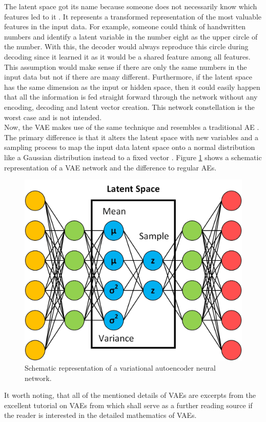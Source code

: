 \documentclass[MGS,Master,english]{twbook}%
\begin{document}
The latent space got its name because someone does not necessarily know which features led to it \cite{ml::vae::tutorial}. It represents a transformed representation of the most valuable features in the input data. For example, someone could think of handwritten numbers and identify a latent variable in the number eight as the upper circle of the number. With this, the decoder would always reproduce this circle during decoding since it learned it as it would be a shared feature among all features. This assumption would make sense if there are only the same numbers in the input data but not if there are many different. Furthermore, if the latent space has the same dimension as the input or hidden space, then it could easily happen that all the information is fed straight forward through the network without any encoding, decoding and latent vector creation. This network constellation is the worst case and is not intended.\\
Now, the \ac{VAE} makes use of the same technique and resembles a traditional \ac{AE} \cite{ml::vae::tutorial}. The primary difference is that it alters the latent space with new variables and a sampling process to map the input data latent space onto a normal distribution like a Gaussian distribution instead to a fixed vector \cite{ml::vae::tutorial}. Figure \ref{fig::vae} shows a schematic representation of a VAE network and the difference to regular \acp{AE}. 
\begin{figure}[!htbp]
	\centering
	\includegraphics[width=0.65\linewidth]{PICs/NNs/variational_autoencoder}
	\caption{Schematic representation of a variational autoencoder neural network.} \label{fig::vae}
\end{figure}

It worth noting, that all of the mentioned details of VAEs are excerpts from the excellent tutorial on VAEs from \citep{ml::vae::tutorial} which shall serve as a further reading source if the reader is interested in the detailed mathematics of VAEs.
\end{document}
